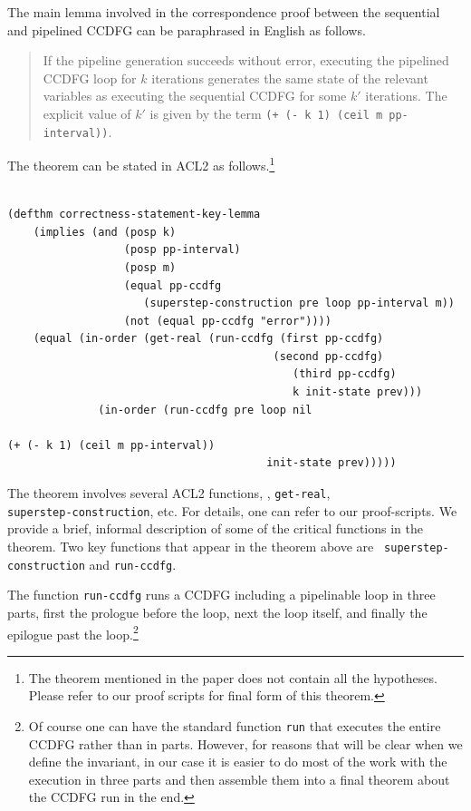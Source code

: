 
The main lemma involved in the correspondence proof between
the sequential and pipelined CCDFG can be paraphrased in English as follows. 

\begin{quote}
 If the pipeline generation succeeds without error,
 executing the pipelined CCDFG loop for $k$ iterations
 generates the same state of the relevant variables as
 executing the sequential CCDFG for some $k'$ iterations.
 The explicit value of $k'$ is given by the term {\tt (+ (-
   k 1) (ceil m pp-interval))}.
 \end{quote}

The theorem can be stated in ACL2 as follows.\footnote{The theorem mentioned in the paper does not contain
all the hypotheses. Please refer to our proof scripts
for final form of this theorem.}

\small
\begin{verbatim}
    
(defthm correctness-statement-key-lemma
    (implies (and (posp k)
                  (posp pp-interval)
                  (posp m)
                  (equal pp-ccdfg 
                     (superstep-construction pre loop pp-interval m))
                  (not (equal pp-ccdfg "error"))))
    (equal (in-order (get-real (run-ccdfg (first pp-ccdfg) 
                                         (second pp-ccdfg) 
                            	            (third pp-ccdfg) 
                            	            k init-state prev)))
              (in-order (run-ccdfg pre loop nil 
								               		                  (+ (- k 1) (ceil m pp-interval)) 
                                 		init-state prev)))))
\end{verbatim}
\normalsize

The theorem involves several ACL2 functions, \eg,
{\tt get-real}, \\ {\tt superstep-construction}, etc. 
For details, one can
  refer to our proof-scripts. 
We provide a brief, informal
description of some of the critical functions in the theorem.
Two key functions that appear in the theorem above are {\tt
  superstep-construction} and {\tt run-ccdfg}.  

The function {\tt run-ccdfg} runs a CCDFG including a
pipelinable loop in three parts, first the prologue before the
loop, next the loop itself, and finally the epilogue past the
loop.\footnote{Of course one can have the standard function
  {\tt run} that executes the entire CCDFG rather than in
  parts.  However, for reasons that will be clear when we
  define the invariant, in our case it is easier to do most
  of the work with the execution in three parts and then
  assemble them into a final theorem about the CCDFG run in
  the end.}  

